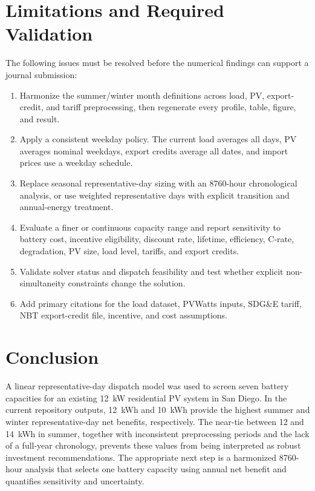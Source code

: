 \documentclass[journal]{IEEEtran}
\begin{document}
\section{Limitations and Required Validation}
The following issues must be resolved before the numerical findings can support a journal submission:
\begin{enumerate}
    \item Harmonize the summer/winter month definitions across load, PV, export-credit, and tariff preprocessing, then regenerate every profile, table, figure, and result.
    \item Apply a consistent weekday policy. The current load averages all days, PV averages nominal weekdays, export credits average all dates, and import prices use a weekday schedule.
    \item Replace seasonal representative-day sizing with an 8760-hour chronological analysis, or use weighted representative days with explicit transition and annual-energy treatment.
    \item Evaluate a finer or continuous capacity range and report sensitivity to battery cost, incentive eligibility, discount rate, lifetime, efficiency, C-rate, degradation, PV size, load level, tariffs, and export credits.
    \item Validate solver status and dispatch feasibility and test whether explicit non-simultaneity constraints change the solution.
    \item Add primary citations for the load dataset, PVWatts inputs, SDG\&E tariff, NBT export-credit file, incentive, and cost assumptions.
\end{enumerate}

\section{Conclusion}
A linear representative-day dispatch model was used to screen seven battery capacities for an existing 12~kW residential PV system in San Diego. In the current repository outputs, 12~kWh and 10~kWh provide the highest summer and winter representative-day net benefits, respectively. The near-tie between 12 and 14~kWh in summer, together with inconsistent preprocessing periods and the lack of a full-year chronology, prevents these values from being interpreted as robust investment recommendations. The appropriate next step is a harmonized 8760-hour analysis that selects one battery capacity using annual net benefit and quantifies sensitivity and uncertainty.



\end{document}
